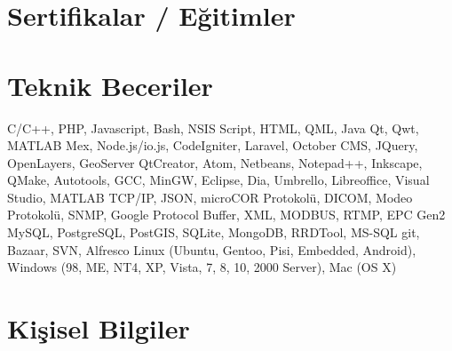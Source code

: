 \documentclass{moderncv}                           %
\begin{document}
\section{Sertifikalar / Eğitimler}




\section{Teknik Beceriler}

{C/C++, PHP, Javascript, Bash, NSIS Script, HTML, QML, Java}
{Qt, Qwt, MATLAB Mex, Node.js/io.js, CodeIgniter, Laravel, October CMS, JQuery, OpenLayers, GeoServer}
{QtCreator, Atom, Netbeans, Notepad++, Inkscape, QMake, Autotools, GCC, MinGW, Eclipse, Dia, Umbrello, Libreoffice, Visual Studio, MATLAB}
{TCP/IP, JSON, microCOR Protokolü, DICOM, Modeo Protokolü, SNMP, Google Protocol Buffer, XML, MODBUS, RTMP, EPC Gen2}
{MySQL, PostgreSQL, PostGIS, SQLite, MongoDB, RRDTool, MS-SQL}
{git, Bazaar, SVN, Alfresco}
{Linux (Ubuntu, Gentoo, Pisi, Embedded, Android), Windows (98, ME, NT4, XP, Vista, 7, 8, 10, 2000 Server), Mac (OS X)}



\section{Kişisel Bilgiler}


\nocite{*}
%
\end{document}
